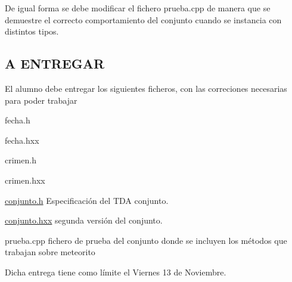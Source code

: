 De igual forma se debe modificar el fichero prueba.\-cpp de manera que se demuestre el correcto comportamiento del conjunto cuando se instancia con distintos tipos.\hypertarget{index_entrega}{}\subsection{A E\-N\-T\-R\-E\-G\-A\-R}\label{index_entrega}
El alumno debe entregar los siguientes ficheros, con las correciones necesarias para poder trabajar \begin{DoxyItemize}
\item fecha.\-h \item fecha.\-hxx \item crimen.\-h \item crimen.\-hxx \item \hyperlink{conjunto_8h_source}{conjunto.\-h} Especificación del T\-D\-A conjunto. \item \hyperlink{conjunto_8hxx_source}{conjunto.\-hxx} segunda versión del conjunto. \item prueba.\-cpp fichero de prueba del conjunto donde se incluyen los métodos que trabajan sobre meteorito\end{DoxyItemize}
Dicha entrega tiene como límite el Viernes 13 de Noviembre. 